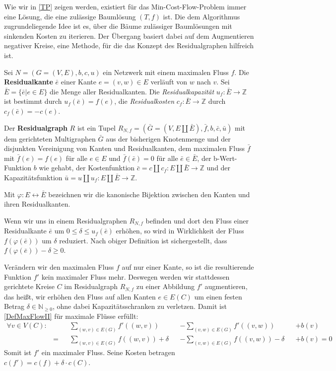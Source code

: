 Wie wir in \cref{TP} zeigen werden, existiert für das Min-Cost-Flow-Problem immer eine Lösung, die eine zulässige Baumlösung $(T,f)$ ist. Die dem Algorithmus zugrundeliegende Idee ist es, über die Bäume zulässiger Baumlösungen mit sinkenden Kosten zu iterieren. Der Übergang basiert dabei auf dem Augmentieren negativer Kreise, eine Methode, für die das Konzept des Residualgraphen hilfreich ist.

\begin{defn}\label{defRes}Sei $N=(G=(V,E),b,c,u)$ ein Netzwerk mit einem maximalen Fluss $f$. Die \textbf{Residualkante} $\bar{e}$ einer Kante $e=(v,w)\in E$ verläuft von $w$ nach $v$. Sei $\bar{E}=\{\bar{e}|e\in E\}$ die Menge aller Residualkanten. Die \textit{Residualkapazität} $u_f:\bar{E}\rightarrow\mathbb{Z}$ ist bestimmt durch $u_f(\bar{e})=f(e)$, die \textit{Residualkosten} $c_f:\bar{E}\rightarrow\mathbb{Z}$ durch $c_f(\bar{e})=-c(e)$.

Der \textbf{Residualgraph} $R$ ist ein Tupel $R_{N,f}=(\bar{G}=(V,E\amalg\bar{E}),\bar{f},b,\bar{c},\bar{u})$ mit dem gerichteten Multigraphen $\bar{G}$ aus der bisherigen Knotenmenge und der disjunkten Vereinigung von Kanten und Residualkanten, dem maximalen Fluss $\bar{f}$ mit $\bar{f}(e)=f(e)$ für alle $e\in E$ und $\bar{f}(\bar{e})=0$ für alle $\bar{e}\in\bar{E}$, der b-Wert-Funktion $b$ wie gehabt, der Kostenfunktion $\bar{c}=c\amalg c_f:E\amalg\bar{E}\rightarrow\mathbb{Z}$ und der Kapazitätsfunktion $\bar{u}=u\amalg u_f:E\amalg\bar{E}\rightarrow\mathbb{Z}$.\end{defn}

\begin{nota}Mit $\varphi:E\leftrightarrow\bar{E}$ bezeichnen wir die kanonische Bijektion zwischen den Kanten und ihren Residualkanten.\end{nota}

Wenn wir uns in einem Residualgraphen $R_{N,f}$ befinden und dort den Fluss einer Residualkante $\bar{e}$ um $0\leq\delta\leq u_f(\bar{e})$ erhöhen, so wird in Wirklichkeit der Fluss $f(\varphi(\bar{e}))$ um $\delta$ reduziert. Nach obiger Definition ist sichergestellt, dass $f(\varphi(\bar{e}))-\delta\geq0$.

Verändern wir den maximalen Fluss $f$ auf nur einer Kante, so ist die resultierende Funktion $f'$ kein maximaler Fluss mehr. Deswegen werden wir stattdessen gerichtete Kreise $C$ im Residualgraph $R_{N,f}$ zu einer Abbildung $f'$ augmentieren, das heißt, wir erhöhen den Fluss auf allen Kanten $e\in E(C)$ um einen festen Betrag $\delta\in\mathbb{N}_{\geq0}$, ohne dabei Kapazitätsschranken zu verletzen. Damit ist \cref{DefMaxFlowII} für maximale Flüsse erfüllt:
\begin{align*}
\forall v\in V(C) :&&&\sum_{(w,v)\in E(G)} f'((w,v)) &&-\sum_{(v,w)\in E(G)} f'((v,w)) &&+ b(v) \\
&=&&\sum_{(w,v)\in E(G)} f((w,v)) + \delta &&-\sum_{(v,w)\in E(G)} f((v,w)) - \delta &&+ b(v) = 0\end{align*}
Somit ist $f'$ ein maximaler Fluss. Seine Kosten betragen $c(f')=c(f) + \delta\cdot c(C)$.

